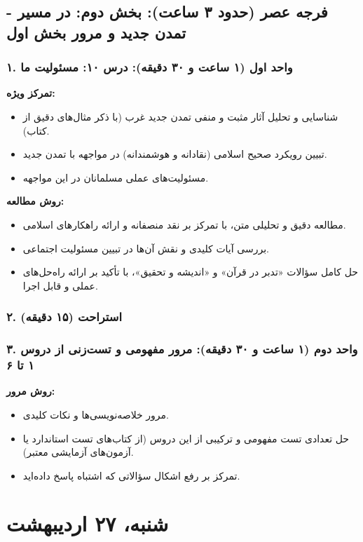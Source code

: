 \documentclass[12pt,a4paper]{article}
\begin{document}
\hrulefill
\subsection*{فرجه عصر (حدود ۳ ساعت): بخش دوم: در مسیر - تمدن جدید و مرور بخش اول}

\subsubsection*{۱. واحد اول (۱ ساعت و ۳۰ دقیقه): درس ۱۰: مسئولیت ما}
\textbf{تمرکز ویژه:}
\begin{itemize}
    \item شناسایی و تحلیل آثار مثبت و منفی تمدن جدید غرب (با ذکر مثال‌های دقیق از کتاب).
    \item تبیین رویکرد صحیح اسلامی (نقادانه و هوشمندانه) در مواجهه با تمدن جدید.
    \item مسئولیت‌های عملی مسلمانان در این مواجهه.
\end{itemize}
\textbf{روش مطالعه:}
\begin{itemize}
    \item مطالعه دقیق و تحلیلی متن، با تمرکز بر نقد منصفانه و ارائه راهکارهای اسلامی.
    \item بررسی آیات کلیدی و نقش آن‌ها در تبیین مسئولیت اجتماعی.
    \item حل کامل سؤالات «تدبر در قرآن» و «اندیشه و تحقیق»، با تأکید بر ارائه راه‌حل‌های عملی و قابل اجرا.
\end{itemize}

\subsubsection*{۲. استراحت (۱۵ دقیقه)}

\subsubsection*{۳. واحد دوم (۱ ساعت و ۳۰ دقیقه): مرور مفهومی و تست‌زنی از دروس ۱ تا ۶}
\textbf{روش مرور:}
\begin{itemize}
    \item مرور خلاصه‌نویسی‌ها و نکات کلیدی.
    \item حل تعدادی تست مفهومی و ترکیبی از این دروس (از کتاب‌های تست استاندارد یا آزمون‌های آزمایشی معتبر).
    \item تمرکز بر رفع اشکال سؤالاتی که اشتباه پاسخ داده‌اید.
\end{itemize}

\hrulefill
\section*{شنبه، ۲۷ اردیبهشت}
\end{document}
